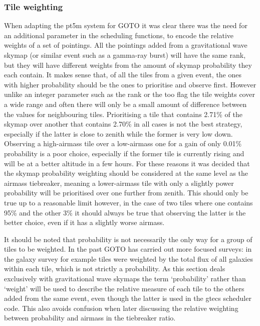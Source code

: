 \begin{colsection}
\begin{colsection}
\subsubsection{Tile weighting}

When adapting the \gls{pt5m} system for GOTO it was clear there was the need for an additional parameter in the scheduling functions, to encode the relative weights of a set of pointings. All the pointings added from a gravitational wave skymap (or similar event such as a gamma-ray burst) will have the same rank, but they will have different weights from the amount of skymap probability they each contain. It makes sense that, of all the tiles from a given event, the ones with higher probability should be the ones to prioritise and observe first. However unlike an integer parameter such as the rank or the \gls{too} flag the tile weights cover a wide range and often there will only be a small amount of difference between the values for neighbouring tiles. Prioritising a tile that contains 2.71\% of the skymap over another that contains 2.70\% in all cases is not the best strategy, especially if the latter is close to zenith while the former is very low down. Observing a high-airmass tile over a low-airmass one for a gain of only 0.01\% probability is a poor choice, especially if the former tile is currently rising and will be at a better altitude in a few hours. For these reasons it was decided that the skymap probability weighting should be considered at the same level as the airmass tiebreaker, meaning a lower-airmass tile with only a slightly power probability will be prioritised over one further from zenith. This should only be true up to a reasonable limit however, in the case of two tiles where one contains 95\% and the other 3\% it should always be true that observing the latter is the better choice, even if it has a slightly worse airmass.

It should be noted that probability is not necessarily the only way for a group of tiles to be weighted. In the past GOTO has carried out more focused surveys: in the galaxy survey for example tiles were weighted by the total flux of all galaxies within each tile, which is not strictly a probability. As this section deals exclusively with gravitational wave skymaps the term `probability' rather than `weight' will be used to describe the relative measure of each tile to the others added from the same event, even though the latter is used in the \gls{gtecs} scheduler code. This also avoids confusion when later discussing the relative weighting between probability and airmass in the tiebreaker ratio.


\end{colsection}
\end{colsection}
